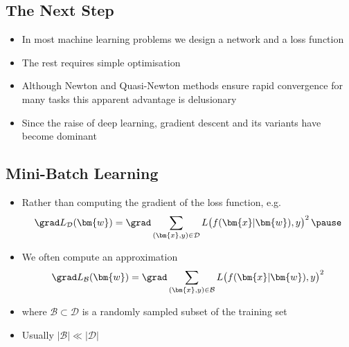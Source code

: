 \Outline %

\begin{slide}
\section{The Next Step}

\begin{PauseHighLight}
  \begin{itemize}
  \item In most machine learning problems we design a network and a
    loss function\pause
  \item The rest requires simple optimisation\pause
  \item Although Newton and Quasi-Newton methods ensure rapid
    convergence for many tasks this apparent advantage is
    delusionary\pause
  \item Since the raise of deep learning, gradient descent and its
    variants have become dominant\pause    
  \end{itemize}
\end{PauseHighLight}

\end{slide}


\begin{slide}
\section{Mini-Batch Learning}

\begin{PauseHighLight}
  \begin{itemize}
  \item Rather than computing the gradient of the loss function, e.g.
    \begin{align*}
      \grad L_{\mathcal{D}}(\bm{w}) = \grad \sum_{(\bm{x},y)\in\mathcal{D}}
      L\!\left( \strut f(\bm{x}|\bm{w}), y \right)^2\pause
    \end{align*}
  \item We often compute an approximation
    \begin{align*}
      \grad L_{\mathcal{B}}(\bm{w})
      = \grad \sum_{(\bm{x},y)\in\mathcal{B}}
      L\!\left( \strut f(\bm{x}|\bm{w}), y \right)^2
    \end{align*}
  \item where $\mathcal{B}\subset\mathcal{D}$ is a randomly sampled
    subset of the training set\pause
  \item Usually $|\mathcal{B}| \ll |\mathcal{D}|$\pause
  \end{itemize}
\end{PauseHighLight}

\end{slide}

